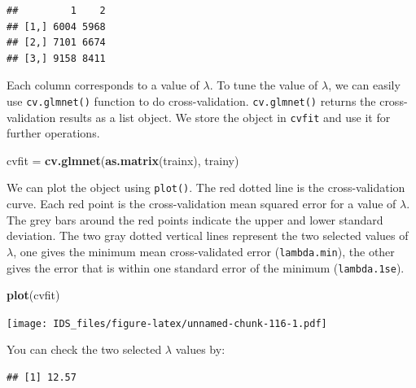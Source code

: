 \documentclass[12pt,]{krantz}
\makeatletter
\newenvironment{Shaded}{\begin{snugshade}}{\end{snugshade}}
\newcommand{\CommentTok}[1]{\textcolor[rgb]{0.37,0.37,0.37}{\textit{#1}}}
\newcommand{\FloatTok}[1]{\textcolor[rgb]{0.06,0.06,0.06}{#1}}
\newcommand{\KeywordTok}[1]{\textcolor[rgb]{0.27,0.27,0.27}{\textbf{#1}}}
\newcommand{\NormalTok}[1]{#1}
\newcommand{\OperatorTok}[1]{\textcolor[rgb]{0.43,0.43,0.43}{\textbf{#1}}}
\newcommand{\StringTok}[1]{\textcolor[rgb]{0.5,0.5,0.5}{#1}}
\newenvironment{kframe}{%
\medskip{}
\setlength{\fboxsep}{.8em}
 \def\at@end@of@kframe{}%
 \ifinner\ifhmode%
  \def\at@end@of@kframe{\end{minipage}}%
  \begin{minipage}{\columnwidth}%
 \fi\fi%
 \def\FrameCommand##1{\hskip\@totalleftmargin \hskip-\fboxsep
 \colorbox{shadecolor}{##1}\hskip-\fboxsep
     \hskip-\linewidth \hskip-\@totalleftmargin \hskip\columnwidth}%
 \MakeFramed {\advance\hsize-\width
   \@totalleftmargin\z@ \linewidth\hsize
   \@setminipage}}%
 {\par\unskip\endMakeFramed%
 \at@end@of@kframe}
\renewenvironment{Shaded}{\begin{kframe}}{\end{kframe}}
\makeatother
\begin{document}
\begin{verbatim}
##         1    2
## [1,] 6004 5968
## [2,] 7101 6674
## [3,] 9158 8411
\end{verbatim}

Each column corresponds to a value of \(\lambda\). To tune the value of \(\lambda\), we can easily use \texttt{cv.glmnet()} function to do cross-validation. \texttt{cv.glmnet()} returns the cross-validation results as a list object. We store the object in \texttt{cvfit} and use it for further operations.

\begin{Shaded}
\begin{Highlighting}[]
\NormalTok{cvfit =}\StringTok{ }\KeywordTok{cv.glmnet}\NormalTok{(}\KeywordTok{as.matrix}\NormalTok{(trainx), trainy)}
\end{Highlighting}
\end{Shaded}

We can plot the object using \texttt{plot()}. The red dotted line is the cross-validation curve. Each red point is the cross-validation mean squared error for a value of \(\lambda\). The grey bars around the red points indicate the upper and lower standard deviation. The two gray dotted vertical lines represent the two selected values of \(\lambda\), one gives the minimum mean cross-validated error (\texttt{lambda.min}), the other gives the error that is within one standard error of the minimum (\texttt{lambda.1se}).

\begin{Shaded}
\begin{Highlighting}[]
\KeywordTok{plot}\NormalTok{(cvfit)}
\end{Highlighting}
\end{Shaded}

\texttt{[image: IDS\_files/figure-latex/unnamed-chunk-116-1.pdf]}

You can check the two selected \(\lambda\) values by:

\begin{Shaded}
\end{Shaded}

\begin{verbatim}
## [1] 12.57
\end{verbatim}

\begin{Shaded}
\end{Shaded}
\end{document}
